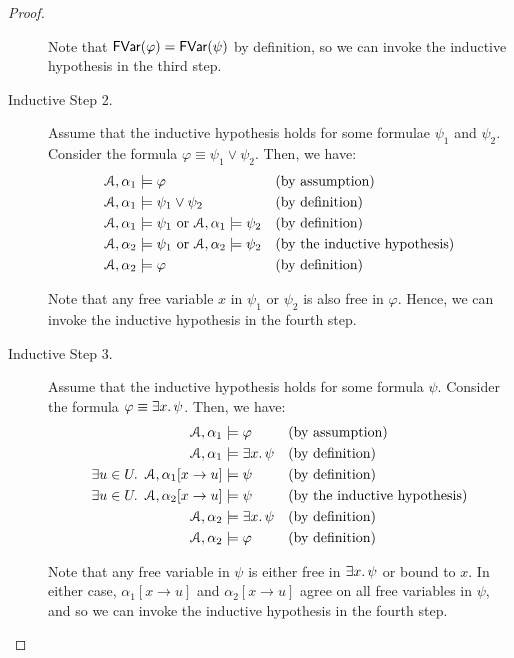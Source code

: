 \documentclass[11pt,usenames, dvipsnames]{article}
\begin{document}
\begin{proof}
\begin{description}
    Note that $\mathsf{FVar}(\varphi) = \mathsf{FVar}(\psi)$ by definition, so we can invoke the inductive hypothesis in the third step.

    \item[Inductive Step 2.] Assume that the inductive hypothesis holds for some formulae $\psi_1$ and $\psi_2$. Consider the formula $\varphi \equiv \psi_1 \lor \psi_2$. Then, we have:
    \begin{align*}
      \struct, \alpha_1 &\models \varphi &&\text{(by assumption)}
      \\
      \struct, \alpha_1 &\models \psi_1 \lor \psi_2 &&\text{(by definition)}
      \\
      \struct, \alpha_1 &\models \psi_1 \text{ or } \struct, \alpha_1 \models \psi_2 &&\text{(by definition)}
      \\
      \struct, \alpha_2 &\models \psi_1 \text{ or } \struct, \alpha_2 \models \psi_2 &&\text{(by the inductive hypothesis)}
      \\
      \struct, \alpha_2 &\models \varphi &&\text{(by definition)}
    \end{align*}

    Note that any free variable $x$ in $\psi_1$ or $\psi_2$ is also free in $\varphi$. Hence, we can invoke the inductive hypothesis in the fourth step.

    \item[Inductive Step 3.] Assume that the inductive hypothesis holds for some formula $\psi$. Consider the formula $\varphi \equiv \exists x \ldotp \psi$. Then, we have:
    \begin{align*}
      \struct, \alpha_1 &\models \varphi &&\text{(by assumption)}
      \\
      \struct, \alpha_1 &\models \exists x \ldotp \psi &&\text{(by definition)}
      \\
      \exists u \in U \ldotp \ \struct, \alpha_1[x \to u] &\models \psi &&\text{(by definition)}
      \\
      \exists u \in U \ldotp \ \struct, \alpha_2[x \to u] &\models \psi &&\text{(by the inductive hypothesis)}
      \\
      \struct, \alpha_2 &\models \exists x \ldotp \psi &&\text{(by definition)}
      \\
      \struct, \alpha_2 &\models \varphi &&\text{(by definition)}
    \end{align*}

    Note that any free variable in $\psi$ is either free in $\exists x \ldotp \psi$ or bound to $x$. In either case, $\alpha_1[x \to u]$ and $\alpha_2[x \to u]$ agree on all free variables in $\psi$, and so we can invoke the inductive hypothesis in the fourth step.
  \end{description}


\end{proof}
\end{document}
